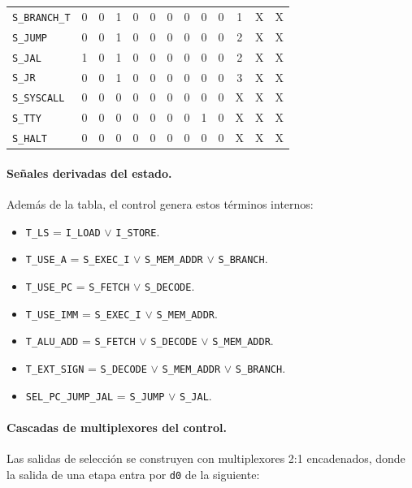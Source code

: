 \documentclass[11pt,a4paper]{article}
\begin{document}
\begin{longtable}{@{}p{2.25cm}cccccccccccc@{}}
\texttt{S\_BRANCH\_T}& 0 & 0 & 1 & 0 & 0 & 0 & 0 & 0 & 0 & 1 & X & X \\
\texttt{S\_JUMP}     & 0 & 0 & 1 & 0 & 0 & 0 & 0 & 0 & 0 & 2 & X & X \\
\texttt{S\_JAL}      & 1 & 0 & 1 & 0 & 0 & 0 & 0 & 0 & 0 & 2 & X & X \\
\texttt{S\_JR}       & 0 & 0 & 1 & 0 & 0 & 0 & 0 & 0 & 0 & 3 & X & X \\
\texttt{S\_SYSCALL}  & 0 & 0 & 0 & 0 & 0 & 0 & 0 & 0 & 0 & X & X & X \\
\texttt{S\_TTY}      & 0 & 0 & 0 & 0 & 0 & 0 & 0 & 1 & 0 & X & X & X \\
\texttt{S\_HALT}     & 0 & 0 & 0 & 0 & 0 & 0 & 0 & 0 & 0 & X & X & X \\
\bottomrule
\end{longtable}

\paragraph{Señales derivadas del estado.}
Además de la tabla, el control genera estos términos internos:

\begin{itemize}
  \item \texttt{T\_LS} = \texttt{I\_LOAD} $\lor$ \texttt{I\_STORE}.
  \item \texttt{T\_USE\_A} = \texttt{S\_EXEC\_I} $\lor$ \texttt{S\_MEM\_ADDR} $\lor$ \texttt{S\_BRANCH}.
  \item \texttt{T\_USE\_PC} = \texttt{S\_FETCH} $\lor$ \texttt{S\_DECODE}.
  \item \texttt{T\_USE\_IMM} = \texttt{S\_EXEC\_I} $\lor$ \texttt{S\_MEM\_ADDR}.
  \item \texttt{T\_ALU\_ADD} = \texttt{S\_FETCH} $\lor$ \texttt{S\_DECODE} $\lor$ \texttt{S\_MEM\_ADDR}.
  \item \texttt{T\_EXT\_SIGN} = \texttt{S\_DECODE} $\lor$ \texttt{S\_MEM\_ADDR} $\lor$ \texttt{S\_BRANCH}.
  \item \texttt{SEL\_PC\_JUMP\_JAL} = \texttt{S\_JUMP} $\lor$ \texttt{S\_JAL}.
\end{itemize}

\paragraph{Cascadas de multiplexores del control.}
Las salidas de selección se construyen con multiplexores 2:1 encadenados, donde la salida de una etapa entra por \texttt{d0} de la siguiente:
\end{document}
